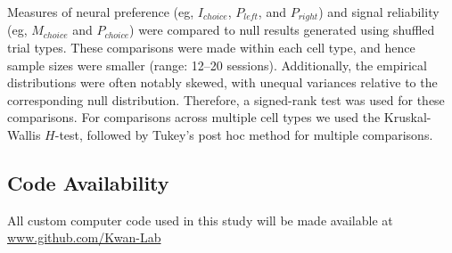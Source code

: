 Measures of neural preference (eg, $I_{\mathit{choice}}$, $P_{\mathit{left}}$, and $P_{\mathit{right}}$) and signal reliability (eg, $M_{\mathit{choice}}$ and $P_{\mathit{choice}}$) were compared to null results generated using shuffled trial types. These comparisons were made within each cell type, and hence sample sizes were smaller (range: 12--20 sessions). Additionally, the empirical distributions were often notably skewed, with unequal variances relative to the corresponding null distribution. Therefore, a signed-rank test was used for these comparisons. For comparisons across multiple cell types we used the Kruskal-Wallis $H$-test, followed by Tukey's post hoc method for multiple comparisons. 

\subsection*{Code Availability} All custom computer code used in this study will be made available at \url{www.github.com/Kwan-Lab}